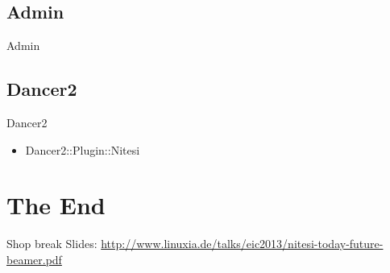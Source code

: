 \subsection{Admin}
\begin{frame}{Admin}

\end{frame}

\subsection{Dancer2}
\begin{frame}{Dancer2}
\begin{itemize}
\item Dancer2::Plugin::Nitesi
\end{itemize}
\end{frame}

\section{The End}

\begin{frame}{Shop break}
Slides:
\url{http://www.linuxia.de/talks/eic2013/nitesi-today-future-beamer.pdf}
\end{frame}




